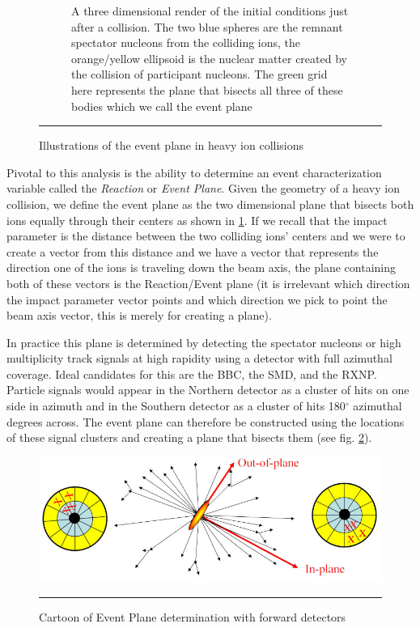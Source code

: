 \begin{figure}[htbp!]
\begin{subfigure}[p]{0.7\textwidth}
	\caption[Central vs Peripheral collisions, geometry of initial conditions]{A three dimensional render of the initial conditions just after a collision. The two blue spheres are the remnant spectator nucleons from the colliding ions, the orange/yellow ellipsoid is the nuclear matter created by the collision of participant nucleons. The green grid here represents the plane that bisects all three of these bodies which we call the event plane}
    \end{subfigure}
    \rule{35em}{0.5pt}
  \caption[Illustrations of the event plane in heavy ion collisions]{Illustrations of the event plane in heavy ion collisions}
  \label{fig:evtpln}
\end{figure}

Pivotal to this analysis is the ability to determine an event characterization variable called the \textit{Reaction} or \textit{Event Plane}. Given the geometry of a heavy ion collision, we define the event plane as the two dimensional plane that bisects both ions equally through their centers as shown in \ref{fig:evtpln}. If we recall that the impact parameter is the distance between the two colliding ions' centers and we were to create a vector from this distance and we have a vector that represents the direction one of the ions is traveling down the beam axis, the plane containing both of these vectors is the Reaction/Event plane (it is irrelevant which direction the impact parameter vector points and which direction we pick to point the beam axis vector, this is merely for creating a plane).

In practice this plane is determined by detecting the spectator nucleons or high multiplicity track signals at high rapidity using a detector with full azimuthal coverage. Ideal candidates for this are the BBC, the SMD, and the RXNP. Particle signals would appear in the Northern detector as a cluster of hits on one side in azimuth and in the Southern detector as a cluster of hits 180$^\circ$ azimuthal degrees across. The event plane can therefore be constructed using the locations of these signal clusters and creating a plane that bisects them (see fig. \ref{fig:rxnpexpcartoon}).

\begin{figure}[htbp!]
  \centering
    \includegraphics[width=1\textwidth]{Figures/reactionplaneexpcartoon.jpg}
    \rule{35em}{0.5pt}
  \caption[Cartoon of Event Plane determination with forward detectors]{Cartoon of Event Plane determination with forward detectors \citep{RXNPfocus}}
  \label{fig:rxnpexpcartoon}
\end{figure}



